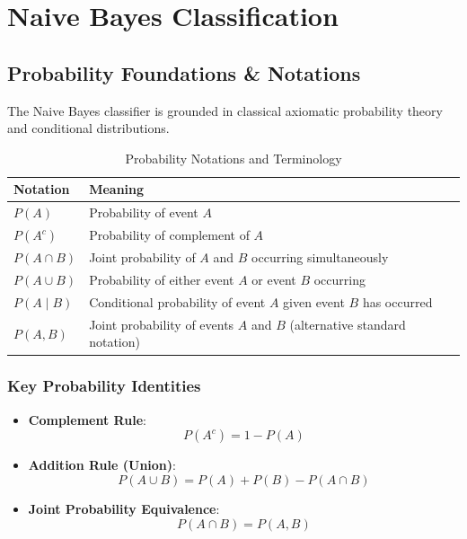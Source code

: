 \chapter{Naive Bayes Classification}

\section{Probability Foundations \& Notations}

The Naive Bayes classifier is grounded in classical axiomatic probability theory and conditional distributions.

\begin{table}[htbp]
\centering
\caption{Probability Notations and Terminology}
\vspace{0.2em}
\begin{tabular}{ll}
\toprule
\textbf{Notation} & \textbf{Meaning} \\
\midrule
$P(A)$ & Probability of event $A$ \\
\addlinespace[0.3em]
$P(A^c)$ & Probability of complement of $A$ \\
\addlinespace[0.3em]
$P(A \cap B)$ & Joint probability of $A$ and $B$ occurring simultaneously \\
\addlinespace[0.3em]
$P(A \cup B)$ & Probability of either event $A$ or event $B$ occurring \\
\addlinespace[0.3em]
$P(A \mid B)$ & Conditional probability of event $A$ given event $B$ has occurred \\
\addlinespace[0.3em]
$P(A, B)$ & Joint probability of events $A$ and $B$ (alternative standard notation) \\
\bottomrule
\end{tabular}
\end{table}

\subsection{Key Probability Identities}
\begin{itemize}[leftmargin=1.5em]
    \item \textbf{Complement Rule}:
    \begin{equation}
    P(A^c) = 1 - P(A)
    \end{equation}
    \item \textbf{Addition Rule (Union)}:
    \begin{equation}
    P(A \cup B) = P(A) + P(B) - P(A \cap B)
    \end{equation}
    \item \textbf{Joint Probability Equivalence}:
    \begin{equation}
    P(A \cap B) = P(A, B)
    \end{equation}
\end{itemize}

